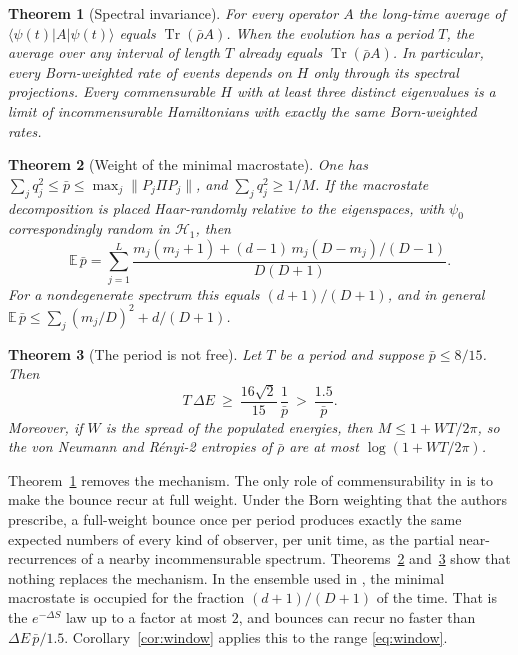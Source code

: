 \documentclass[11pt]{amsart}
\newtheorem{mainthm}{Theorem}
\theoremstyle{definition}
\newcommand{\EE}{\mathbb{E}}
\newcommand{\Tr}{\operatorname{Tr}}
\newcommand{\rb}{\bar\rho}
\begin{document}
\begin{mainthm}[Spectral invariance]\label{thm:A}
For every operator $A$ the long-time average of $\langle\psi(t)|A|\psi(t)\rangle$ equals $\Tr(\rb A)$. When the evolution has a period $T$, the average over any interval of length $T$ already equals $\Tr(\rb A)$. In particular, every Born-weighted rate of events depends on $H$ only through its spectral projections. Every commensurable $H$ with at least three distinct eigenvalues is a limit of incommensurable Hamiltonians with exactly the same Born-weighted rates.
\end{mainthm}

\begin{mainthm}[Weight of the minimal macrostate]\label{thm:B}
One has $\sum_jq_j^2\le\bar p\le\max_j\|P_j\Pi P_j\|$, and $\sum_j q_j^2\ge 1/M$. If the macrostate decomposition is placed Haar-randomly relative to the eigenspaces, with $\psi_0$ correspondingly random in $\mathcal H_1$, then
\begin{equation}\label{eq:haar}
\EE\,\bar p=\sum_{j=1}^L\frac{m_j(m_j+1)+(d-1)\,m_j(D-m_j)/(D-1)}{D(D+1)} .
\end{equation}
For a nondegenerate spectrum this equals $(d+1)/(D+1)$, and in general $\EE\,\bar p\le\sum_j(m_j/D)^2+d/(D+1)$.
\end{mainthm}

\begin{mainthm}[The period is not free]\label{thm:C}
Let $T$ be a period and suppose $\bar p\le 8/15$. Then
\[
T\,\Delta E\ \ge\ \frac{16\sqrt2}{15}\,\frac1{\bar p}\ >\ \frac{1.5}{\bar p}.
\]
Moreover, if $W$ is the spread of the populated energies, then $M\le 1+WT/2\pi$, so the von Neumann and R\'enyi-2 entropies of $\rb$ are at most $\log(1+WT/2\pi)$.
\end{mainthm}

Theorem~\ref{thm:A} removes the mechanism. The only role of commensurability in \cite{CDD26} is to make the bounce recur at full weight. Under the Born weighting that the authors prescribe, a full-weight bounce once per period produces exactly the same expected numbers of every kind of observer, per unit time, as the partial near-recurrences of a nearby incommensurable spectrum. Theorems~\ref{thm:B} and~\ref{thm:C} show that nothing replaces the mechanism. In the ensemble used in \cite{CDD26}, the minimal macrostate is occupied for the fraction $(d+1)/(D+1)$ of the time. That is the $e^{-\Delta S}$ law up to a factor at most $2$, and bounces can recur no faster than $\Delta E\,\bar p/1.5$. Corollary~\ref{cor:window} applies this to the range \eqref{eq:window}.
\end{document}
